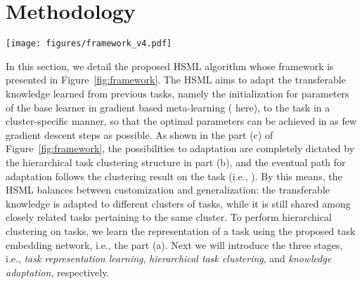 \documentclass{article}
\begin{document}
%
 \section{Methodology}
\begin{figure*}[h]
	\centering
 	\texttt{[image: figures/framework\_v4.pdf]}
	\caption{The framework of the proposed HSML involving three essential stages.
	(a) Task representation learning:
	we learn the representation for the task  using an autoencoder aggregator (e.g., pooling aggregator, recurrent aggregator).
	(b) Hierarchical task clustering: provided with the task representation, we learn the soft clustering assignment with this differentiable hierarchical clustering structure. Darker nodes signify more likely assigned clusters (e.g., the cluster 1 in the first level and the cluster B in the second level).
(c) Knowledge adaptation: we next use a parameter gate to adapt the transferable knowledge () to a cluster-specific initialization () from which only a few gradient descent steps are required to achieve the optimal parameters .
}
	\label{fig:framework}
\end{figure*}
In this section, we 
detail the proposed HSML algorithm whose framework is presented in Figure~\ref{fig:framework}. The HSML aims to adapt the transferable knowledge learned from previous tasks, namely the initialization for parameters of the base learner in gradient based meta-learning ( here), to the task  in a cluster-specific manner, so that the optimal parameters  can be achieved in as few gradient descent steps as possible. 
As shown in the part (c) of Figure~\ref{fig:framework}, the possibilities to adaptation are completely dictated by the hierarchical task clustering structure in part (b), and the eventual path for adaptation follows the clustering result on the task  (i.e., ).
By this means, the HSML balances between customization and generalization: the transferable knowledge is adapted to different clusters of tasks, while it is still shared among closely related tasks pertaining to the same cluster. 
To perform hierarchical clustering on tasks, we learn the representation of a task using the proposed task embedding network, i.e., the part (a). 
Next we will introduce the three stages, i.e., \emph{task representation learning}, \emph{hierarchical task clustering}, and \emph{knowledge adaptation}, respectively.
\end{document}
